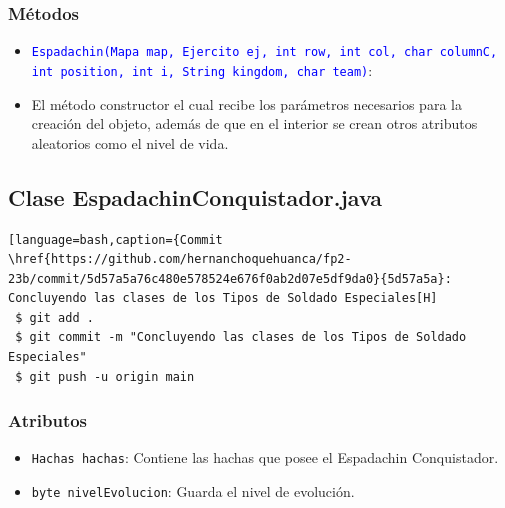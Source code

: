 \documentclass{article}
\begin{document}
\subsubsection{Métodos}
\begin{itemize}
    \item \texttt{\textcolor{blue}{Espadachin(Mapa map, Ejercito ej, int row, int col, char columnC, int position, int i, String kingdom, char team)}}: 
    \item El método constructor el cual recibe los parámetros necesarios para la creación del objeto, además de que en el interior se crean otros atributos aleatorios como el nivel de vida.
\end{itemize}



\newpage
\subsection{Clase EspadachinConquistador.java}
\begin{lstlisting}[language=bash,caption={Commit \href{https://github.com/hernanchoquehuanca/fp2-23b/commit/5d57a5a76c480e578524e676f0ab2d07e5df9da0}{5d57a5a}: Concluyendo las clases de los Tipos de Soldado Especiales[H]
 $ git add .
 $ git commit -m "Concluyendo las clases de los Tipos de Soldado Especiales"			
 $ git push -u origin main
\end{lstlisting}

\subsubsection{Atributos}
\begin{itemize}
    \item \texttt{Hachas hachas}: Contiene las hachas que posee el Espadachin Conquistador.
    \item \texttt{byte nivelEvolucion}: Guarda el nivel de evolución.
\end{itemize}

\end{document}
